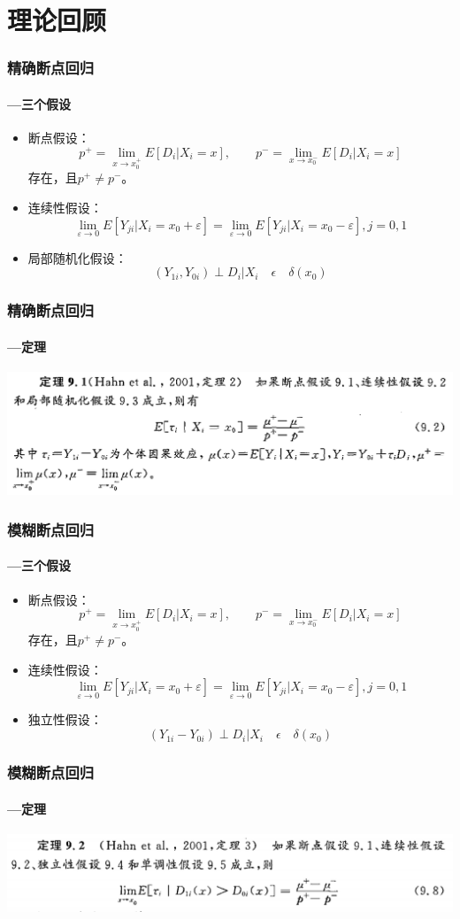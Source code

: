 
\section{理论回顾 } 

\begin{frame}
\frametitle{精确断点回归}
\framesubtitle{---三个假设}
\begin{itemize}
	\item 断点假设：\[
	p^+=\lim\limits_{x\longrightarrow x_0^+}E[D_i|X_i=x],\qquad
	p^-=\lim\limits_{x\longrightarrow x_0^-}E[D_i|X_i=x]
	\]存在，且$p^+\neq p^-$。
	\item 连续性假设：
	\[
	\lim\limits_{\varepsilon \longrightarrow 0}E[Y_{ji}|X_i=x_0+\varepsilon]=
	\lim\limits_{\varepsilon \longrightarrow 0}E[Y_{ji}|X_i=x_0-\varepsilon],j=0,1
	\]
	\item 局部随机化假设：
	\[
	(Y_{1i},Y_{0i})\perp D_i|X_i\quad \epsilon \quad \delta(x_0)
	\]
\end{itemize}
\end{frame}


\begin{frame}
\frametitle{精确断点回归}
\framesubtitle{---定理}
\includegraphics[width=\textwidth]{image/dl.png}
\end{frame}


\begin{frame}
	\frametitle{模糊断点回归}
	\framesubtitle{---三个假设}
	\begin{itemize}
		\item 断点假设：\[
		p^+=\lim\limits_{x\longrightarrow x_0^+}E[D_i|X_i=x],\qquad
		p^-=\lim\limits_{x\longrightarrow x_0^-}E[D_i|X_i=x]
		\]存在，且$p^+\neq p^-$。
		\item 连续性假设：
		\[
		\lim\limits_{\varepsilon \longrightarrow 0}E[Y_{ji}|X_i=x_0+\varepsilon]=
		\lim\limits_{\varepsilon \longrightarrow 0}E[Y_{ji}|X_i=x_0-\varepsilon],j=0,1
		\]
		\item 独立性假设：
		\[
		(Y_{1i}-Y_{0i})\perp D_i|X_i\quad \epsilon \quad \delta(x_0)
		\]
	\end{itemize}
\end{frame}


\begin{frame}
	\frametitle{模糊断点回归}
	\framesubtitle{---定理}
	\includegraphics[width=\textwidth]{image/d2.png}
\end{frame}

